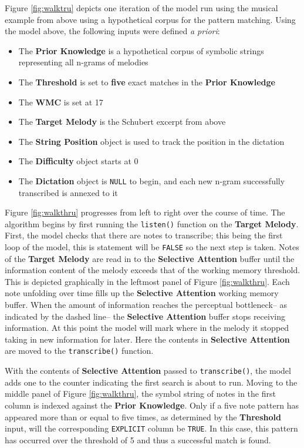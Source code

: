\documentclass[12pt,]{book}
\providecommand{\tightlist}{%
  \setlength{\itemsep}{0pt}\setlength{\parskip}{0pt}}
\begin{document}
Figure \ref{fig:walktru} depicts one iteration of the model run using the musical example from above using a hypothetical corpus for the pattern matching.
Using the model above, the following inputs were defined \emph{a priori}:

\begin{itemize}
\tightlist
\item
  The \textbf{Prior Knowledge} is a hypothetical corpus of symbolic strings representing all n-grams of melodies
\item
  The \textbf{Threshold} is set to \textbf{five} exact matches in the \textbf{Prior Knowledge}
\item
  The \textbf{WMC} is set at 17
\item
  The \textbf{Target Melody} is the Schubert excerpt from above
\item
  The \textbf{String Position} object is used to track the position in the dictation
\item
  The \textbf{Difficulty} object starts at 0
\item
  The \textbf{Dictation} object is \texttt{NULL} to begin, and each new n-gram successfully transcribed is annexed to it
\end{itemize}

Figure \ref{fig:walkthru} progresses from left to right over the course of time.
The algorithm begins by first running the \texttt{listen()} function on the \textbf{Target Melody}.
First, the model checks that there are notes to transcribe; this being the first loop of the model, this is statement will be \texttt{FALSE} so the next step is taken.
Notes of the \textbf{Target Melody} are read in to the \textbf{Selective Attention} buffer until the information content of the melody exceeds that of the working memory threshold.
This is depicted graphically in the leftmost panel of Figure \ref{fig:walkthru}.
Each note unfolding over time fills up the \textbf{Selective Attention} working memory buffer.
When the amount of information reaches the perceptual bottleneck-- as indicated by the dashed line-- the \textbf{Selective Attention} buffer stops receiving information.
At this point the model will mark where in the melody it stopped taking in new information for later.
Here the contents in \textbf{Selective Attention} are moved to the \texttt{transcribe()} function.

With the contents of \textbf{Selective Attention} passed to \texttt{transcribe()}, the model adds one to the counter indicating the first search is about to run.
Moving to the middle panel of Figure \ref{fig:walkthru}, the symbol string of notes in the first column is indexed against the \textbf{Prior Knowledge}.
Only if a five note pattern has appeared more than or equal to five times, as determined by the \textbf{Threshold} input, will the corresponding \texttt{EXPLICIT} column be \texttt{TRUE}.
In this case, this pattern has occurred over the threshold of 5 and thus a successful match is found.
\end{document}
